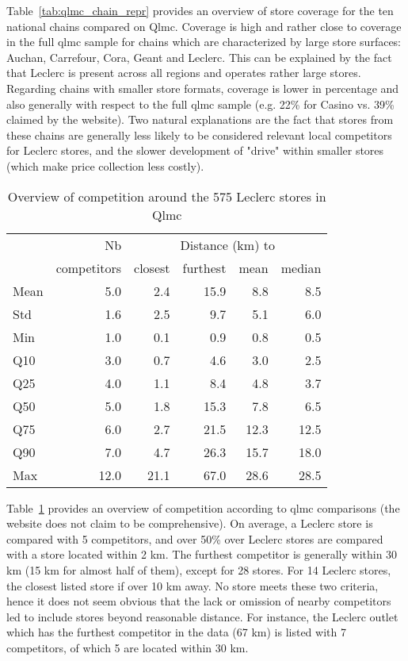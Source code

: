 \documentclass[english]{article}
\begin{document}
Table~\ref{tab:qlmc_chain_repr} provides an overview of store coverage for the ten national chains compared on Qlmc. Coverage is high and rather close to coverage in the full qlmc sample for chains which are characterized by large store surfaces: Auchan, Carrefour, Cora, Geant and Leclerc. This can be explained by the fact that Leclerc is present across all regions and operates rather large stores. Regarding chains with smaller store formats, coverage is lower in percentage and also generally with respect to the full qlmc sample (e.g. 22\% for Casino vs. 39\% claimed by the website). Two natural explanations are the fact that stores from these chains are generally less likely to be considered relevant local competitors for Leclerc stores, and the slower development of "drive" within smaller stores (which make price collection less costly).

\begin{table}[H]
\renewcommand{\arraystretch}{0.7}%
\caption{Overview of competition around the 575 Leclerc stores in Qlmc}\label{tab:qlmc_comp}
\small
\begin{tabular}{lr|rrrr}
\toprule
\toprule
{}         & Nb          &    \multicolumn{4}{c}{Distance (km) to} \\
{}         & competitors &    closest & furthest & mean & median \\
\midrule
Mean  &   5.0 &   2.4 &  15.9 &   8.8 &     8.5 \\
Std   &   1.6 &   2.5 &   9.7 &   5.1 &     6.0 \\
Min   &   1.0 &   0.1 &   0.9 &   0.8 &     0.5 \\
Q10   &   3.0 &   0.7 &   4.6 &   3.0 &     2.5 \\
Q25   &   4.0 &   1.1 &   8.4 &   4.8 &     3.7 \\
Q50   &   5.0 &   1.8 &  15.3 &   7.8 &     6.5 \\
Q75   &   6.0 &   2.7 &  21.5 &  12.3 &    12.5 \\
Q90   &   7.0 &   4.7 &  26.3 &  15.7 &    18.0 \\
Max   &  12.0 &  21.1 &  67.0 &  28.6 &    28.5 \\
\bottomrule
\bottomrule
\end{tabular}
\end{table}

Table~\ref{tab:qlmc_comp} provides an overview of competition according to qlmc comparisons (the website does not claim to be comprehensive). On average, a Leclerc store is compared with 5 competitors, and over 50\% over Leclerc stores are compared with a store located within 2 km. The furthest competitor is generally within 30 km (15 km for almost half of them), except for 28 stores. For 14 Leclerc stores, the closest listed store if over 10 km away. No store meets these two criteria, hence it does not seem obvious that the lack or omission of nearby competitors led to include stores beyond reasonable distance. For instance, the Leclerc outlet which has the furthest competitor in the data (67 km) is listed with 7 competitors, of which 5 are located within 30 km.
\end{document}
